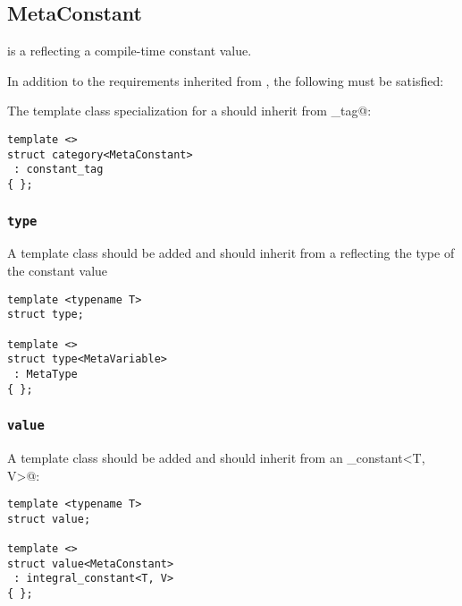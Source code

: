 \subsection{MetaConstant}
\label{concept-MetaConstant}

 is a  reflecting a compile-time constant value.

In addition to the requirements inherited from , the following must
be satisfied:

The \verb@category@ template class specialization for a  should
inherit from \verb@constant_tag@:

\begin{verbatim}
template <>
struct category<MetaConstant>
 : constant_tag
{ };
\end{verbatim}

\subsubsection{\texttt{type}}

A template class \verb@type@ should be added and should inherit
from a  reflecting the type of the constant value

\begin{verbatim}
template <typename T>
struct type;

template <>
struct type<MetaVariable>
 : MetaType
{ };
\end{verbatim}

\subsubsection{\texttt{value}}

A template class \verb@value@ should be added and should inherit
from an \verb@integral_constant<T, V>@:

\begin{verbatim}
template <typename T>
struct value;

template <>
struct value<MetaConstant>
 : integral_constant<T, V>
{ };
\end{verbatim}


